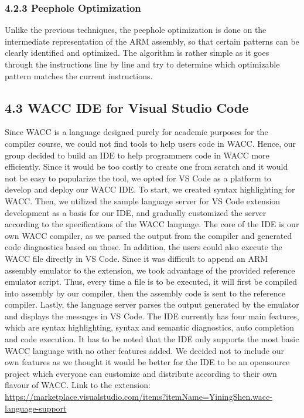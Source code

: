 \documentclass[10pt,a4paper,]{report}
\begin{document}
  \subsubsection*{4.2.3	Peephole Optimization}
  Unlike the previous techniques, the peephole optimization is done on the
  intermediate representation of the ARM assembly, so that certain patterns can
  be clearly identified and optimized. The algorithm is rather simple as it goes
  through the instructions line by line and try to determine which optimizable
  pattern matches the current instructions.

  \subsection*{4.3 WACC IDE for Visual Studio Code}
  Since WACC is a language designed purely for academic purposes for the
  compiler course, we could not find tools to help users code in WACC. Hence, 
  our group decided to build an IDE to help programmers code in WACC more
  efficiently. Since it would be too costly to create one from scratch and 
  it would not be easy to popularize the tool, we opted for VS Code as a platform
  to develop and deploy our WACC IDE. To start, we created syntax highlighting
  for WACC. Then, we utilized the sample language server for VS Code extension
  development as a basis for our IDE, and gradually customized the server
  according to the specifications of the WACC language. The core of the IDE is
  our own WACC compiler, as we parsed the output from the compiler and generated
  code diagnostics based on those. In addition, the users could also execute the
  WACC file directly in VS Code. Since it was difficult to append an ARM
  assembly emulator to the extension, we took advantage of the provided
  reference emulator script. Thus, every time a file is to be executed, 
  it will first be compiled into assembly by our compiler, then the assembly
  code is sent to the reference compiler. Lastly, the language server parses the 
  output generated by the emulator and displays the messages in VS Code. The IDE
  currently has four main features, which are syntax highlighting, syntax and
  semantic diagnostics, auto completion and code execution. It has to be noted
  that the IDE only supports the most basic WACC language with no other features
  added. We decided not to include our own features as we thought it would be
  better for the IDE to be an opensource project which everyone can customize
  and distribute according to their own flavour of WACC. Link to the extension: 
  \url{https://marketplace.visualstudio.com/items?itemName=YiningShen.wacc-language-support}
\end{document}
